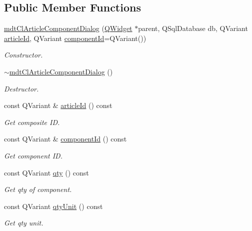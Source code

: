 \subsection*{Public Member Functions}
\begin{DoxyCompactItemize}
\item 
\hyperlink{classmdt_cl_article_component_dialog_a293d48a40384b4e6b545907473ad54a4}{mdt\-Cl\-Article\-Component\-Dialog} (\hyperlink{class_q_widget}{Q\-Widget} $\ast$parent, Q\-Sql\-Database db, Q\-Variant \hyperlink{classmdt_cl_article_component_dialog_a71ba3f37673877ef16680d8d6568799c}{article\-Id}, Q\-Variant \hyperlink{classmdt_cl_article_component_dialog_ab95b190a2bcd240266134942b74d8c45}{component\-Id}=Q\-Variant())
\begin{DoxyCompactList}\small\item\em Constructor. \end{DoxyCompactList}\item 
\hyperlink{classmdt_cl_article_component_dialog_a5ec276610871f18bc0ed2fab6f219c04}{$\sim$mdt\-Cl\-Article\-Component\-Dialog} ()
\begin{DoxyCompactList}\small\item\em Destructor. \end{DoxyCompactList}\item 
const Q\-Variant \& \hyperlink{classmdt_cl_article_component_dialog_a71ba3f37673877ef16680d8d6568799c}{article\-Id} () const 
\begin{DoxyCompactList}\small\item\em Get composite I\-D. \end{DoxyCompactList}\item 
const Q\-Variant \& \hyperlink{classmdt_cl_article_component_dialog_ab95b190a2bcd240266134942b74d8c45}{component\-Id} () const 
\begin{DoxyCompactList}\small\item\em Get component I\-D. \end{DoxyCompactList}\item 
const Q\-Variant \hyperlink{classmdt_cl_article_component_dialog_a66881d6c4d4d8791bd5e29b127c913db}{qty} () const 
\begin{DoxyCompactList}\small\item\em Get qty of component. \end{DoxyCompactList}\item 
const Q\-Variant \hyperlink{classmdt_cl_article_component_dialog_a799575d51b0a2e80985bab8e25d9c5da}{qty\-Unit} () const 
\begin{DoxyCompactList}\small\item\em Get qty unit. \end{DoxyCompactList}\end{DoxyCompactItemize}


